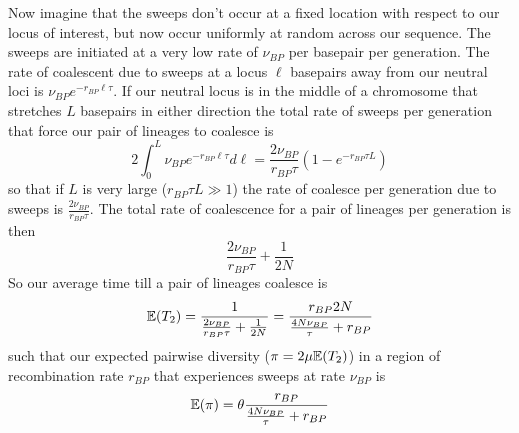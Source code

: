Now imagine that the sweeps don't occur at a fixed location with
respect to our locus of interest, but now occur uniformly at random
across our sequence. The sweeps are initiated at a very low rate of
$\nu_{BP}$ per basepair per generation. The rate of coalescent due to
sweeps at a locus $\ell$ basepairs away from our neutral loci is
$\nu_{BP} e^{-r_{BP} \ell \tau}$. If our neutral locus is in the
middle of a chromosome that stretches $L$ basepairs in either direction
the total rate of sweeps per generation that force our pair of lineages to coalesce is
\begin{equation}
2\int_0^{L} \nu_{BP} e^{-r_{BP} \ell \tau} d \ell =
\frac{2\nu_{BP}}{r_{BP} \tau} \left(1-e^{-r_{BP} \tau L} \right)
\end{equation}
so that if $L$ is very large ($r_{BP} \tau L \gg 1$) the rate of coalesce per
generation due to sweeps is $\frac{2\nu_{BP}}{r_{BP} \tau}$. The total rate
of coalescence for a pair of lineages per generation is then
\begin{equation}
\frac{2\nu_{BP}}{r_{BP} \tau}+\frac{1}{2N}
\end{equation}
So our average time till a pair of lineages coalesce is
\begin{equation}
\mathbb{E}(T_2) = \frac{1}{\frac{2\nu_{BP}}{r_{BP} \tau}+\frac{1}{2N}} = \frac{r_{BP}2N}{\frac{4N\nu_{BP}}{ \tau}+r_{BP}}
\end{equation}
such that our expected pairwise diversity ($\pi=2\mu\mathbb{E}(T_2)$) in a region of
recombination rate $r_{BP}$ that experiences sweeps at rate $\nu_{BP}$
is  
\begin{equation}
\mathbb{E}(\pi) = \theta \frac{r_{BP}}{\frac{4N\nu_{BP}}{ \tau}+r_{BP}} \label{eqn:pi_GW_HH}
\end{equation}




